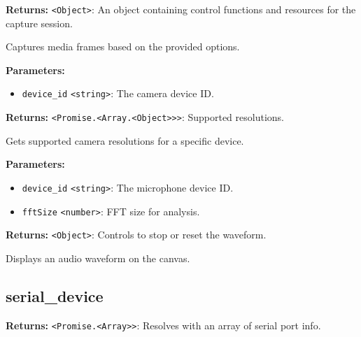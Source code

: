 \documentclass[12pt,a4paper]{article}
\begin{document}
\noindent \textbf{Returns:} \texttt{<Object>}: An object containing control functions and resources for the capture session.

\noindent Captures media frames based on the provided options.

\vspace{5mm}
\noindent {}


\noindent \textbf{Parameters:}
\begin{itemize}
  \item \texttt{device\_id} \texttt{<string>}: The camera device ID.
\end{itemize}

\noindent \textbf{Returns:} \texttt{<Promise.<Array.<Object>>>}: Supported resolutions.

\noindent Gets supported camera resolutions for a specific device.

\vspace{5mm}
\noindent {}


\noindent \textbf{Parameters:}
\begin{itemize}
  \item \texttt{device\_id} \texttt{<string>}: The microphone device ID.
  \item \texttt{fftSize} \texttt{<number>}: FFT size for analysis.
\end{itemize}

\noindent \textbf{Returns:} \texttt{<Object>}: Controls to stop or reset the waveform.

\noindent Displays an audio waveform on the canvas.


\subsection{serial\_device}
\vspace{5mm}
\noindent {}


\noindent \textbf{Returns:} \texttt{<Promise.<Array>>}: Resolves with an array of serial port info.
\end{document}
